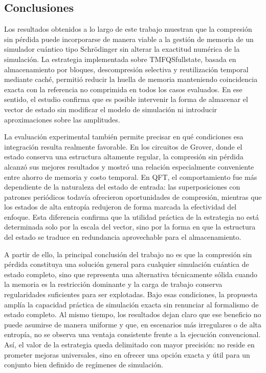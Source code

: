 \subsection{Conclusiones}

Los resultados obtenidos a lo largo de este trabajo muestran que la compresión
sin pérdida puede incorporarse de manera viable a la gestión de memoria de un
simulador cuántico tipo Schrödinger sin alterar la exactitud numérica de la
simulación. La estrategia implementada sobre TMFQSfullstate, basada en
almacenamiento por bloques, descompresión selectiva y reutilización temporal
mediante caché, permitió reducir la huella de memoria manteniendo coincidencia
exacta con la referencia no comprimida en todos los casos evaluados. En ese
sentido, el estudio confirma que es posible intervenir la forma de almacenar el
vector de estado sin modificar el modelo de simulación ni introducir
aproximaciones sobre las amplitudes.

La evaluación experimental también permite precisar en qué condiciones esa
integración resulta realmente favorable. En los circuitos de Grover, donde el
estado conserva una estructura altamente regular, la compresión sin pérdida
alcanzó sus mejores resultados y mostró una relación especialmente conveniente
entre ahorro de memoria y costo temporal. En QFT, el comportamiento fue más
dependiente de la naturaleza del estado de entrada: las superposiciones con
patrones periódicos todavía ofrecieron oportunidades de compresión, mientras que
los estados de alta entropía redujeron de forma marcada la efectividad del
enfoque. Esta diferencia confirma que la utilidad práctica de la estrategia no
está determinada solo por la escala del vector, sino por la forma en que la
estructura del estado se traduce en redundancia aprovechable para el
almacenamiento.

A partir de ello, la principal conclusión del trabajo no es que la compresión
sin pérdida constituya una solución general para cualquier simulación cuántica de
estado completo, sino que representa una alternativa técnicamente sólida cuando
la memoria es la restricción dominante y la carga de trabajo conserva
regularidades suficientes para ser explotadas. Bajo esas condiciones, la
propuesta amplía la capacidad práctica de simulación exacta sin renunciar al
formalismo de estado completo. Al mismo tiempo, los resultados dejan claro que
ese beneficio no puede asumirse de manera uniforme y que, en escenarios más
irregulares o de alta entropía, no se observa una ventaja consistente frente a
la ejecución convencional. Así, el valor de la estrategia queda delimitado con
mayor precisión: no reside en prometer mejoras universales, sino en ofrecer una
opción exacta y útil para un conjunto bien definido de regímenes de simulación.